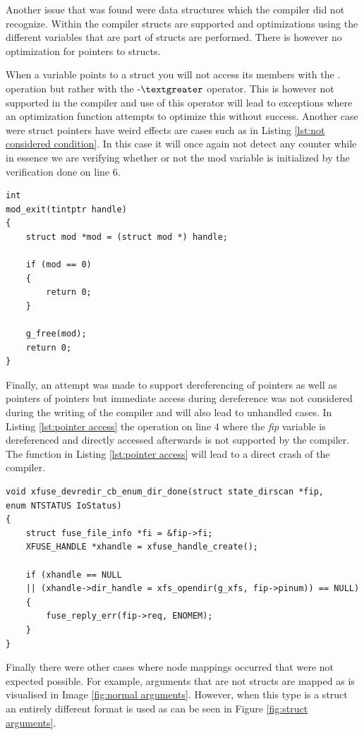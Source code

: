 \documentclass[12pt]{thesis}
\begin{document}
Another issue that was found were data structures which the compiler did not recognize. Within the compiler structs are supported and optimizations using the different variables that are part of structs are performed. There is however no optimization for pointers to structs. 

When a variable points to a struct you will not access its members with the . operation but rather with the -$\textgreater$ operator. This is however not supported in the compiler and use of this operator will lead to exceptions where an optimization function attempts to optimize this without success. Another case were struct pointers have weird effects are cases such as in Listing \ref{lst:not considered condition}. In this case it will once again not detect any counter while in essence we are verifying whether or not the mod variable is initialized by the verification done on line 6.

\begin{lstlisting}[style=CStyle, caption={Example of comparisons not considered by the compiler}, label={lst:not considered condition}]
int
mod_exit(tintptr handle)
{
	struct mod *mod = (struct mod *) handle;
	
	if (mod == 0)
	{
		return 0;
	}
	
	g_free(mod);
	return 0;
}
\end{lstlisting}

Finally, an attempt was made to support dereferencing of pointers as well as pointers of pointers but immediate access during dereference was not considered during the writing of the compiler and will also lead to unhandled cases. In Listing \ref{lst:pointer access} the operation on line 4 where the \textit{fip} variable is dereferenced and directly accessed afterwards is not supported by the compiler. The function in Listing \ref{lst:pointer access} will lead to a direct crash of the compiler.

\begin{lstlisting}[style=CStyle, caption={Example of unsupported access to pointer values}, label={lst:pointer access}]
void xfuse_devredir_cb_enum_dir_done(struct state_dirscan *fip,
enum NTSTATUS IoStatus)
{
	struct fuse_file_info *fi = &fip->fi;
	XFUSE_HANDLE *xhandle = xfuse_handle_create();
	
	if (xhandle == NULL
	|| (xhandle->dir_handle = xfs_opendir(g_xfs, fip->pinum)) == NULL)
	{
		fuse_reply_err(fip->req, ENOMEM);
	}
}
\end{lstlisting}

Finally there were other cases where node mappings occurred that were not expected possible. For example, arguments that are not structs are mapped as is visualised in Image \ref{fig:normal arguments}. However, when this type is a struct an entirely different format is used as can be seen in Figure \ref{fig:struct arguments}.
\end{document}
